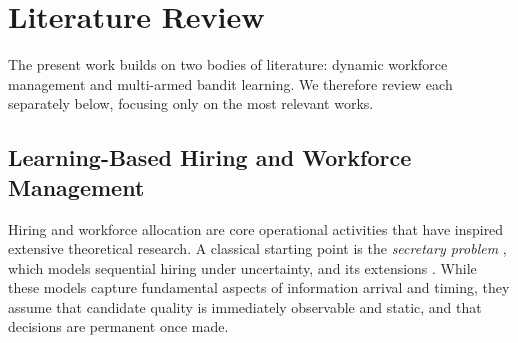 \documentclass[opre,blindrev]{informs3}
\begin{document}
\section{Literature Review
}
The present work builds on two bodies of literature: dynamic workforce management and multi-armed bandit learning. We therefore review each separately below, focusing only on the most relevant works. %

\vspace{-.1in}

\subsection{Learning-Based Hiring and Workforce Management}

Hiring and workforce allocation are core operational activities that have inspired extensive theoretical research. A classical starting point is the \emph{secretary problem} \citep{dynkin1963optimal, ferguson1989who}, which models sequential hiring under uncertainty, and its extensions \citep{kleinberg2005multiple, disser2020hiring, kesselheim2024hiring}. While these models capture fundamental aspects of information arrival and timing, they assume that candidate quality is immediately observable and static, and that decisions are permanent once made.
\end{document}
